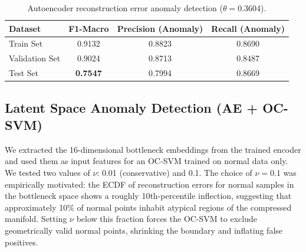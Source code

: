     \vspace{-0.1cm}

    \begin{table}[H]
        \centering
        \begin{tabular}{@{}lccc@{}}
            \toprule
            \textbf{Dataset} & \textbf{F1-Macro} & \textbf{Precision (Anomaly)} & \textbf{Recall (Anomaly)} \\
            \midrule
            Train Set      & 0.9132 & 0.8823 & 0.8690 \\
            Validation Set & 0.9024 & 0.8713 & 0.8487 \\
            Test Set       & \textbf{0.7547} & 0.7994 & 0.8669 \\
            \bottomrule
        \end{tabular}
        \vspace{0.5em}
        \caption{Autoencoder reconstruction error anomaly detection ($\theta = 0.3604$).}
        \label{tab:ae_reconstruction}
    \end{table}

\vspace{-0.2cm}

\subsection{Latent Space Anomaly Detection (AE + OC-SVM)} \label{sec:bottleneck}

    We extracted the 16-dimensional bottleneck embeddings from the trained encoder and used them as input features for an OC-SVM trained on normal data only.
    We tested two values of $\nu$: 0.01 (conservative) and 0.1.
    The choice of $\nu = 0.1$ was empirically motivated: the ECDF of reconstruction errors for normal samples in the bottleneck space shows a roughly 10th-percentile inflection, suggesting that approximately 10\% of normal points inhabit atypical regions of the compressed manifold.
    Setting $\nu$ below this fraction forces the OC-SVM to exclude geometrically valid normal points, shrinking the boundary and inflating false positives.

